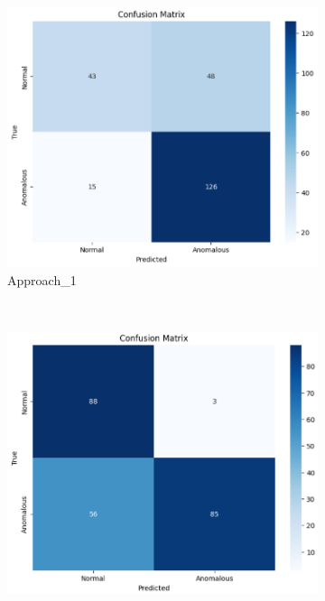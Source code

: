 \documentclass[12pt,DIV14,BCOR12mm,a4paper,footinclude=false,headinclude,parskip=half-,twoside,openright,cleardoublepage=empty,toc=index,bibliography=totoc,listof=totoc]{scrreprt}
\numberwithin{equation}{chapter}
\begin{document}
\begin{figure}
    \centering
    \begin{subfigure}[b]{0.55\textwidth} %
        \centering
        \includegraphics[width=\textwidth]{../media/approach1_confusion.PNG}
        \caption{Approach\_1}
        \label{fig:confusion1}
    \end{subfigure}
    \\ %
    \begin{subfigure}[b]{0.55\textwidth} %
        \centering
        \includegraphics[width=\textwidth]{../media/approach2_confusion.PNG}

\end{subfigure}
\end{figure}
\end{document}
